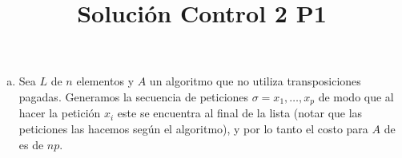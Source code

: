 \documentclass[dcc,uchile]{fcfmcourse}
\title{Solución Control 2 P1}
\begin{document}
\maketitle
\vspace{-1ex}


\begin{problems}
\problem
\begin{enumerate}[(a)]
    \item Sea $L$ de $n$ elementos y $A$ un algoritmo que no utiliza transposiciones pagadas. Generamos la secuencia de peticiones $\sigma = x_{1}, \ldots, x_{p}$ de modo que al hacer la petición $x_{i}$ este se encuentra al final de la lista (notar que las peticiones las hacemos según el algoritmo), y por lo tanto el costo para $A$ de es de $np$.\\
    

\end{enumerate}
\end{problems}
\end{document}

